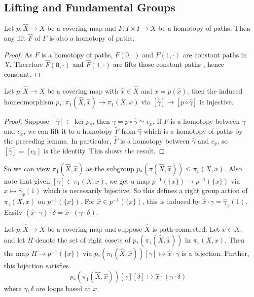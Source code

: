 \subsection{Lifting and Fundamental Groups}
\begin{lemma}
    Let $p:\hat{X}\to X$ be a covering map and $F:I\times I\to X$ be a homotopy of paths.
    Then any lift $\hat{F}$ of $F$ is also a homotopy of paths.
\end{lemma}
\begin{proof}
    As $F$ is a homotopy of paths, $F(0,\cdot)$ and $F(1,\cdot)$ are constant paths in $X$.
    Therefore $\hat{F}(0,\cdot)$ and $\hat{F}(1,\cdot)$ are lifts those constant paths , hence constant.
\end{proof}
\begin{lemma}
    Let $p:\hat{X}\to X$ be a covering map with $\hat{x}\in \hat{X}$ and $x=p(\hat{x})$, then the induced homeomorphism $p_\ast:\pi_1(\hat{X},\hat{x})\to\pi_1(X,x)$ via $[\hat\gamma]\mapsto [p\circ\hat\gamma]$ is injective.
\end{lemma}
\begin{proof}
    Suppose $[\hat{\gamma}]\in\ker p_\ast$, then $\gamma=p\circ\hat{\gamma}\simeq c_x$.
    If $F$ is a homotopy between $\gamma$ and $c_x$, we can lift it to a homotopy $\tilde{F}$ from $\hat{\gamma}$ which is a homotopy of paths by the preceding lemma.
    In particular, $\hat{F}$ is a homotopy between $\hat\gamma$ and $c_{\hat{x}}$, so $[\hat\gamma]=[c_{\hat{x}}]$ is the identity.
    This shows the result.
\end{proof}
\begin{remark}
    So we can view $\pi_1(\hat{X},\hat{x})$ as the subgroup $p_\ast(\pi(\hat{X},\hat{x}))\le\pi_1(X,x)$.
    Also note that given $[\gamma]\in\pi_1(X,x)$, we get a map $p^{-1}(\{x\})\to p^{-1}(\{x\})$ via $\hat{x}\mapsto \hat{\gamma}_{\hat{x}}(1)$ which is necessarily bijective.
    So this defines a right group action of $\pi_1(X,x)$ on $p^{-1}(\{x\})$.
    For $\hat{x}\in p^{-1}(\{x\})$, this is induced by $\hat{x}\cdot\gamma=\hat\gamma_{\hat{x}}(1)$.
    Easily $(\hat{x}\cdot\gamma)\cdot\delta=\hat{x}\cdot(\gamma\cdot\delta)$.
\end{remark}
\begin{lemma}
    Let $p:\hat{X}\to X$ be a covering map and suppose $\hat{X}$ is path-connected.
    Let $x\in X$, and let $\Pi$ denote the set of right cosets of $p_\ast(\pi_1(\hat{X},\hat{x}))$ in $\pi_1(X,x)$.
    Then the map $\Pi\to p^{-1}(\{x\})$ via $p_\ast(\pi_1(\hat{X},\hat{x}))[\gamma]\mapsto \hat{x}\cdot\gamma$ is a bijection.
    Further, this bijection satisfies
    $$p_\ast(\pi_1(\hat{X},\hat{x}))[\gamma][\delta]\mapsto\hat{x}\cdot(\gamma\cdot\delta)$$
    where $\gamma,\delta$ are loops based at $x$.
\end{lemma}
